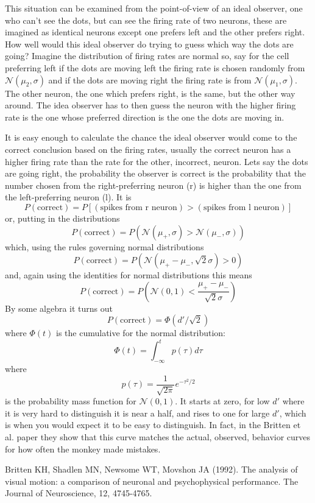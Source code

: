 \documentclass[11pt,a4paper]{scrartcl}
\begin{document}
This situation can be examined from the point-of-view of an ideal
observer, one who can't see the dots, but can see the firing rate of
two neurons, these are imagined as identical neurons except one
prefers left and the other prefers right. How well would this ideal
observer do trying to guess which way the dots are going? Imagine the
distribution of firing rates are normal so, say for the cell
preferring left if the dots are moving left the firing rate is chosen
randomly from $\mathcal{N}(\mu_2,\sigma)$ and if the dots are moving
right the firing rate is from $\mathcal{N}(\mu_1,\sigma)$. The other
neuron, the one which prefers right, is the same, but the other way
around. The idea observer has to then guess the neuron with the higher
firing rate is the one whose preferred direction is the one the dots
are moving in.

It is easy enough to calculate the chance the ideal observer would
come to the correct conclusion based on the firing rates, usually the
correct neuron has a higher firing rate than the rate for the other,
incorrect, neuron. Lets say the dots are going right, the probability
the observer is correct is the probability that the number chosen from
the right-preferring neuron (r) is higher than the one from the left-preferring
neuron (l). It is
\begin{equation}
P(\mbox{correct})=P[(\mbox{spikes from r neuron})>(\mbox{spikes from l neuron})]
\end{equation}
or, putting in the distributions
\begin{equation}
P(\mbox{correct})=P(\mathcal{N}(\mu_+,\sigma)>\mathcal{N}(\mu_-,\sigma))
\end{equation}
which, using the rules governing normal distributions
\begin{equation}
P(\mbox{correct})=P(\mathcal{N}(\mu_+-\mu_-,\sqrt{2}\sigma)>0)
\end{equation}
and, again using the identities for normal distributions this means
\begin{equation}
P(\mbox{correct})=P(\mathcal{N}(0,1)<\frac{\mu_+-\mu_-}{\sqrt{2}\sigma})
\end{equation}
By some algebra it turns out
\begin{equation}
P(\mbox{correct})=\Phi(d'/\sqrt{2})
\end{equation}
where $\Phi(t)$ is the cumulative for the normal distribution:
\begin{equation}
\Phi(t)=\int_{-\infty}^{t}p(\tau)d\tau
\end{equation}
where
\begin{equation}
p(\tau)=\frac{1}{\sqrt{2\pi}}e^{-\tau^2/2}
\end{equation}
is the probability mass function for $\mathcal{N}(0,1)$. It
starts at zero, for low $d'$ where it is very hard to distinguish it is near a half, and rises
to one for large $d'$, which is when you would expect it to be easy to
distinguish. In fact, in the Britten et al. paper
\cite{BrittenEtAl1992} they show that this curve matches the actual,
observed, behavior curves for how often the monkey made mistakes.

\begin{thebibliography}{10}

Britten KH, Shadlen MN, Newsome WT, Movshon JA (1992). The analysis of visual motion: a comparison of neuronal and psychophysical performance. 
\newblock The Journal of Neuroscience, 12, 4745-4765.

\end{thebibliography}
\end{document}
